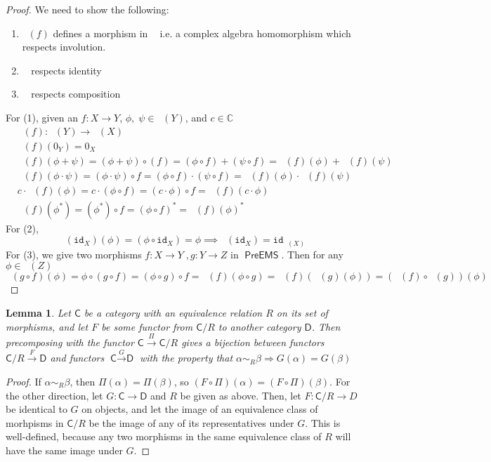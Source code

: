 \documentclass{article}
\newcommand{\C}{\mathbb{C}}
\newtheorem{lemma}[subsection]{Lemma}
\DeclareMathOperator{\calg}{\textsf{CAlg}^{*}_{\mathbb{C}}}
\DeclareMathOperator{\linf}{L^\infty}
\DeclareMathOperator{\preems}{\textsf{PreEMS}}
\begin{document}
\begin{proof} We need to show the following:
\begin{enumerate}
	\item $\linf(f)$ defines a morphism in $\calg$ i.e. a complex algebra homomorphism which respects involution.
	\item $\linf$ respects identity
	\item $\linf$ respects composition
\end{enumerate}
For (1), given an $f: X\rightarrow{Y}$, $\phi,\;\psi\in\linf(Y)$, and $c\in\C$
\begin{equation}
\begin{split}
	&\linf(f) : \linf(Y)\rightarrow{}\linf(X)\\
	&\linf(f)(0_Y) = 0_X\\
	&\linf(f)(\phi+\psi) = (\phi+\psi)\circ(f) = (\phi\circ{f}) + (\psi\circ{f}) = \linf(f) (\phi) + \linf(f)(\psi)\\
	&\linf(f)(\phi\cdot\psi) = (\phi\cdot\psi)\circ{f} = (\phi\circ{f})\cdot(\psi\circ{f}) = \linf(f)(\phi)\cdot\linf(f)(\psi)\\
	&c\cdot\linf(f)(\phi) = c\cdot(\phi\circ{f}) = (c\cdot\phi)\circ{f} = \linf(f)(c\cdot\phi)\\
	&\linf(f)(\phi^*) = (\phi^*)\circ{f} = (\phi\circ{f})^* = \linf(f)(\phi)^*
\end{split}
\end{equation}
For (2),
\begin{equation}
	\linf(\texttt{id}_X)(\phi) = (\phi\circ\texttt{id}_X) = \phi \implies \linf(\texttt{id}_X) = \texttt{id}_{\linf(X)} 
\end{equation}
For (3), we give two morphisms $f: X\rightarrow Y\;,g:Y\rightarrow Z$ in $\preems$.  Then for any $\phi\in\linf(Z)$
\begin{equation}
	\linf(g\circ{}f)(\phi) = \phi\circ(g\circ{f}) = (\phi\circ{g})\circ{f} = \linf(f)(\phi\circ{g}) = \linf(f)(\linf(g)(\phi)) = (\linf(f)\circ{}\linf(g))(\phi)
\end{equation}
\end{proof}
\begin{lemma}
	Let $\textsf{C}$ be a category with an equivalence relation $R$ on its set of morphisms, and let $F$ be some functor from $\textsf{C}/R$ to another category $\textsf{D}$.  Then precomposing with the functor $\textsf{C}\xrightarrow{\Pi}\textsf{C}/R$ gives a bijection between functors $\textsf{C}/R\xrightarrow{F}\textsf{D}$ and functors $\textsf{C}\xrightarrow{G}\textsf{D}$ with the property that $\alpha\sim_R\beta\Rightarrow{}G(\alpha) = G(\beta)$
\end{lemma}
\begin{proof}
	If $\alpha\sim_R\beta$, then $\Pi(\alpha)=\Pi(\beta)$, so $(F\circ\Pi)(\alpha) = (F\circ\Pi)(\beta)$.  For the other direction, let $G:\textsf{C}\rightarrow{\textsf{D}}$ and $R$ be given as above.  Then, let $F: \textsf{C}/R\rightarrow{D}$ be identical to $G$ on objects, and let the image of an equivalence class of morhpisms in $\textsf{C}/R$ be the image of any of its representatives under $G$.  This is well-defined, because any two morphisms in the same equivalence class of $R$ will have the same image under $G$.
\end{proof}
\end{document}
